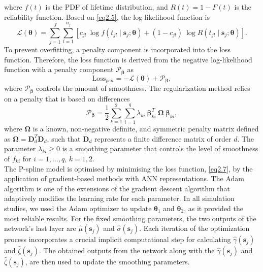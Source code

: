 \documentclass[twoside]{article}
\begin{document}
where $f(t)$ is the PDF of lifetime distribution, and $R(t) = 1- F(t)$ is the reliability function. Based on \eqref{eq2.5}, the log-likelihood function is 
\begin{equation}\label{eq2.6}
\mathcal{L}(\boldsymbol{\theta}) = \sum_{j=1}^{J} \sum_{l=1}^{n_{j}} \left[c_{jl} \: \log f\left(t_{jl} \mid \boldsymbol{s}_{j}; \boldsymbol{\theta}\right) + (1 - c_{jl}) \:\log R\left(t_{jl} \mid \boldsymbol{s}_{j}; \boldsymbol{\theta}\right)\right].
\end{equation}
To prevent overfitting, a penalty component is incorporated into the loss function. Therefore, the loss function is derived from the negative log-likelihood function with a penalty component $\mathcal{P}_{\boldsymbol{\beta}}$ as
\begin{equation}   \label{eq2.7}
\text{Loss}_{pen} = - \mathcal{L}(\boldsymbol{\theta}) + \mathcal{P}_{\boldsymbol{\beta}},
\end{equation}
where $\mathcal{P}_{\boldsymbol{\beta}}$ controls the amount of smoothness. The regularization method relies on a penalty that is based on differences
\begin{equation*}
\mathcal{P}_{\boldsymbol{\beta}} = \frac{1}{2}\sum_{k=1}^{2}\sum_{i=1}^{q} \lambda_{ki} \: \boldsymbol{\beta}^{T}_{ki}\:\boldsymbol{\Omega}\:\boldsymbol{\beta}_{ki},
\end{equation*}
where $\boldsymbol{\Omega}$ is a known, non-negative definite, and symmetric penalty matrix defined as $\boldsymbol{\Omega} = \boldsymbol{D}_{d}^{T}\boldsymbol{D}_{d}$, such that $\boldsymbol{D}_{d}$ represents a finite difference matrix of order $d$. The parameter $\lambda_{ki} \geqslant 0$ is a smoothing parameter that controls the level of smoothness of $f_{ki}$ for $i=1,\ldots,q$, $k=1,2$.\\
The P-spline model is optimised by minimising the loss function, \eqref{eq2.7}, by the application of gradient-based methods with ANN representations. The Adam algorithm \cite{Kingma:Jimmy:2015} is one of the extensions of the gradient descent algorithm that adaptively modifies the learning rate for each parameter. In all simulation studies, we used the Adam optimizer to update $\boldsymbol{\theta}_{1}$ and $\boldsymbol{\theta}_{2}$, as it provided the most reliable results. For the fixed smoothing parameters, the two outputs of the network’s last layer are $\hat{\mu}(\boldsymbol{s}_{j})$ and $\hat{\sigma}(\boldsymbol{s}_{j})$. Each iteration of the optimization process incorporates a crucial implicit computational step for calculating $\hat{\gamma}(\boldsymbol{s}_{j})$ and $\hat{\zeta}(\boldsymbol{s}_{j})$. The obtained outputs from the network along with the $\hat{\gamma}(\boldsymbol{s}_{j})$ and $\hat{\zeta}(\boldsymbol{s}_{j})$, are then used to update the smoothing parameters.
\end{document}
